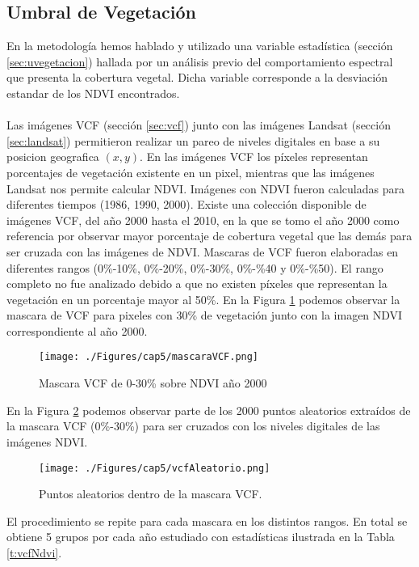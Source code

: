 \subsection{Umbral de Vegetaci\'on}\label{subsec:umbralVegetacion}
En la metodolog\'ia hemos hablado y utilizado una variable estad\'istica (secci\'on \ref{sec:uvegetacion}) hallada por un an\'alisis previo del comportamiento espectral que presenta la cobertura vegetal. Dicha variable corresponde a la desviaci\'on estandar de los NDVI encontrados.\\~\\
Las im\'agenes VCF (secci\'on \ref{sec:vcf}) junto con las im\'agenes Landsat (secci\'on \ref{sec:landsat}) permitieron realizar un pareo de niveles digitales en base a su posicion geografica $ (x,y) $. En las im\'agenes VCF los p\'ixeles representan porcentajes de vegetaci\'on existente en un pixel, mientras que las im\'agenes Landsat nos permite calcular NDVI. Im\'agenes con NDVI fueron calculadas para diferentes tiempos (1986, 1990, 2000). Existe una colecci\'on disponible de im\'agenes VCF, del a\~{n}o 2000 hasta el 2010, en la que se tomo el a\~{n}o 2000 como referencia por observar mayor porcentaje de cobertura vegetal que las dem\'as para ser cruzada con las im\'agenes de NDVI. Mascaras de VCF fueron elaboradas en diferentes rangos (0\%-10\%, 0\%-20\%, 0\%-30\%, 0\%-\%40 y 0\%-\%50). El rango completo no fue analizado debido a que no existen p\'ixeles que representan la vegetaci\'on en un porcentaje mayor al 50\%. En la Figura \ref{fig:mascVCf} podemos observar la mascara de VCF para pixeles con 30\% de vegetaci\'on junto con la imagen NDVI correspondiente al a\~{n}o 2000.
\begin{figure}[H]
	\centering
	\texttt{[image: ./Figures/cap5/mascaraVCF.png]}
	\caption{Mascara VCF de 0-30\% sobre NDVI a\~{n}o 2000}
	\label{fig:mascVCf}
\end{figure}
En la Figura \ref{fig:aleatorioVCf} podemos observar parte de los 2000 puntos aleatorios extra\'idos de la mascara VCF (0\%-30\%) para ser cruzados con los niveles digitales de las im\'agenes NDVI.
\begin{figure}[H]
	\centering
	\texttt{[image: ./Figures/cap5/vcfAleatorio.png]}
	\caption{Puntos aleatorios dentro de la mascara VCF.}
	\label{fig:aleatorioVCf}
\end{figure}
El procedimiento se repite para cada mascara en los distintos rangos. En total se obtiene 5 grupos por cada a\~{n}o estudiado con estad\'isticas ilustrada en la Tabla \ref{t:vcfNdvi}.

